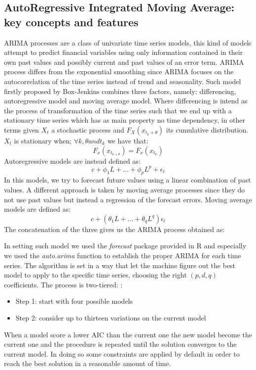 \documentclass[twocolumn]{article}
\begin{document}
\subsection{AutoRegressive Integrated Moving Average: key concepts and features}
ARIMA processes are a class of univariate time series models, this kind of models attempt to predict financial variables using only information contained in their own past values and possibly current and past values of an error term. ARIMA process differs from the exponential smoothing since ARIMA focuses on the autocorrelation of the time series instead of trend and seasonality. Such model firstly proposed by Box-Jenkins\cite{BoxGeorgeTimeSeriesAnalysis} combines three factors, namely: differencing, autoregressive model and moving average model.
\bigbreak
Where differencing is intend as the process of transformation of the time series such that we end up with a stationary time series which has as main property no time dependency, in other terms given $X_t$ a stochastic process and $F_X(x_{t_k+\theta})$ its cumulative distribution. $X_t$ is stationary when; $\forall k,\theta and t_k$ we have that:
\[ F_x(x_{t_{k+\theta}}) = F_x(x_{t_k}) \]
Autoregressive models are instead defined as:
\[ c+\phi_1L+...+\phi_pL^p+\epsilon_t \]
In this models, we try to forecast future values using a linear combination of past values.
A different approach is taken by moving average processes since they do not use past values but instead a regression of the forecast errors.
Moving average models are defined as:
\[c + (\theta_1 L + ... + \theta_q L^q)\epsilon_t \]
The concatenation of the three gives us the ARIMA process obtained as:

In setting such model we used the \textit{forecast} package provided in R \cite{RobHyndmanForecastpackage}
and especially we used the \textit{auto.arima} function to establish the proper ARIMA for each time series. The algorithm is set in a way that let the machine figure out the best model to apply to the specific time series, choosing the right $(p,d,q)$ coefficients. The process is two-tiered: \cite{hyndman_automatic_2007}:
\begin{itemize}
    \item Step 1: start with four possible models
    \item Step 2: consider up to thirteen variations on the current model
\end{itemize}
When a model score a lower AIC than the current one the new model become the current one and the procedure is repeated until the solution converges to the current model. In doing so some constraints are applied by default in order to reach the best solution in a reasonable amount of time.
\end{document}
